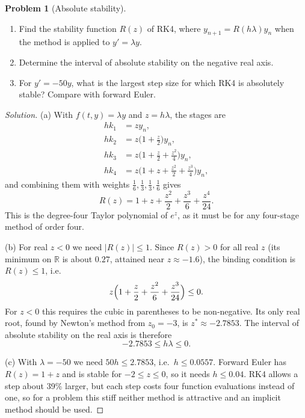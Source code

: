 \documentclass[11pt]{article}
\newcommand{\R}{\mathbb{R}}
\theoremstyle{definition}
\newtheorem{problem}{Problem}
\newenvironment{solution}{\begin{proof}[Solution]}{\end{proof}}
\begin{document}
\begin{problem}[Absolute stability]\label{prob:stability}
\begin{enumerate}[label=(\alph*)]
  \item Find the stability function $R(z)$ of RK4, where $y_{n+1} = R(h\lambda) y_n$ when the method is applied to $y' = \lambda y$.
  \item Determine the interval of absolute stability on the negative real axis.
  \item For $y' = -50y$, what is the largest step size for which RK4 is absolutely stable? Compare with forward Euler.
\end{enumerate}
\end{problem}

\begin{solution}
(a) With $f(t,y) = \lambda y$ and $z = h\lambda$, the stages are
\begin{align*}
  h k_1 &= z y_n, \\
  h k_2 &= z\bigl(1 + \tfrac{z}{2}\bigr) y_n, \\
  h k_3 &= z\bigl(1 + \tfrac{z}{2} + \tfrac{z^2}{4}\bigr) y_n, \\
  h k_4 &= z\bigl(1 + z + \tfrac{z^2}{2} + \tfrac{z^3}{4}\bigr) y_n,
\end{align*}
and combining them with weights $\tfrac16, \tfrac13, \tfrac13, \tfrac16$ gives
\[
  R(z) = 1 + z + \frac{z^2}{2} + \frac{z^3}{6} + \frac{z^4}{24}.
\]
This is the degree-four Taylor polynomial of $e^z$, as it must be for any four-stage method of order four.

(b) For real $z<0$ we need $|R(z)| \le 1$. Since $R(z) > 0$ for all real $z$ (its minimum on $\R$ is about $0.27$, attained near $z \approx -1.6$), the binding condition is $R(z) \le 1$, i.e.
\[
  z\Bigl(1 + \frac{z}{2} + \frac{z^2}{6} + \frac{z^3}{24}\Bigr) \le 0.
\]
For $z<0$ this requires the cubic in parentheses to be non-negative. Its only real root, found by Newton's method from $z_0 = -3$, is $z^\ast \approx -2.7853$. The interval of absolute stability on the real axis is therefore
\[
  -2.7853 \le h\lambda \le 0.
\]

(c) With $\lambda = -50$ we need $50h \le 2.7853$, i.e.\ $h \le 0.0557$. Forward Euler has $R(z) = 1 + z$ and is stable for $-2 \le z \le 0$, so it needs $h \le 0.04$. RK4 allows a step about 39\% larger, but each step costs four function evaluations instead of one, so for a problem this stiff neither method is attractive and an implicit method should be used.
\end{solution}
\end{document}
